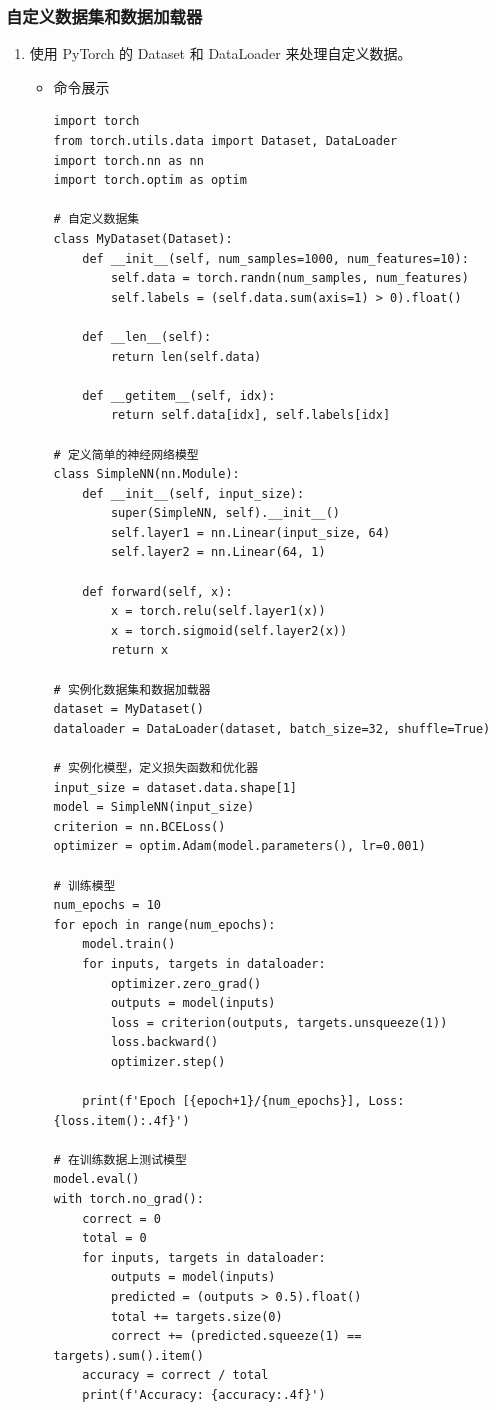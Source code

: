\documentclass[UTF8]{ctexart}
\begin{document}

\subsubsection{自定义数据集和数据加载器}

\begin{enumerate}
  \item 使用 PyTorch 的 Dataset 和 DataLoader 来处理自定义数据。


  \begin{itemize}
  \item 命令展示
  \begin{verbatim}
import torch
from torch.utils.data import Dataset, DataLoader
import torch.nn as nn
import torch.optim as optim

# 自定义数据集
class MyDataset(Dataset):
    def __init__(self, num_samples=1000, num_features=10):
        self.data = torch.randn(num_samples, num_features)
        self.labels = (self.data.sum(axis=1) > 0).float()

    def __len__(self):
        return len(self.data)

    def __getitem__(self, idx):
        return self.data[idx], self.labels[idx]

# 定义简单的神经网络模型
class SimpleNN(nn.Module):
    def __init__(self, input_size):
        super(SimpleNN, self).__init__()
        self.layer1 = nn.Linear(input_size, 64)
        self.layer2 = nn.Linear(64, 1)

    def forward(self, x):
        x = torch.relu(self.layer1(x))
        x = torch.sigmoid(self.layer2(x))
        return x

# 实例化数据集和数据加载器
dataset = MyDataset()
dataloader = DataLoader(dataset, batch_size=32, shuffle=True)

# 实例化模型，定义损失函数和优化器
input_size = dataset.data.shape[1]
model = SimpleNN(input_size)
criterion = nn.BCELoss()
optimizer = optim.Adam(model.parameters(), lr=0.001)

# 训练模型
num_epochs = 10
for epoch in range(num_epochs):
    model.train()
    for inputs, targets in dataloader:
        optimizer.zero_grad()
        outputs = model(inputs)
        loss = criterion(outputs, targets.unsqueeze(1))
        loss.backward()
        optimizer.step()

    print(f'Epoch [{epoch+1}/{num_epochs}], Loss: {loss.item():.4f}')

# 在训练数据上测试模型
model.eval()
with torch.no_grad():
    correct = 0
    total = 0
    for inputs, targets in dataloader:
        outputs = model(inputs)
        predicted = (outputs > 0.5).float()
        total += targets.size(0)
        correct += (predicted.squeeze(1) == targets).sum().item()
    accuracy = correct / total
    print(f'Accuracy: {accuracy:.4f}')


\end{verbatim}
\end{itemize}
\end{enumerate}
\end{document}
